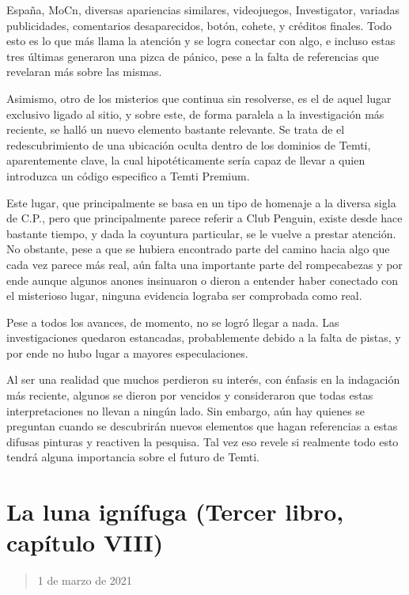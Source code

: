 \documentclass[
  spanish,
]{book}
\begin{document}
España, MoCn, diversas apariencias similares, videojuegos, Investigator, variadas publicidades, comentarios desaparecidos, botón, cohete, y créditos finales. Todo esto es lo que más llama la atención y se logra conectar con algo, e incluso estas tres últimas generaron una pizca de pánico, pese a la falta de referencias que revelaran más sobre las mismas.

Asimismo, otro de los misterios que continua sin resolverse, es el de aquel lugar exclusivo ligado al sitio, y sobre este, de forma paralela a la investigación más reciente, se halló un nuevo elemento bastante relevante. Se trata de el redescubrimiento de una ubicación oculta dentro de los dominios de Temti, aparentemente clave, la cual hipotéticamente sería capaz de llevar a quien introduzca un código especifico a Temti Premium.

Este lugar, que principalmente se basa en un tipo de homenaje a la diversa sigla de C.P., pero que principalmente parece referir a Club Penguin, existe desde hace bastante tiempo, y dada la coyuntura particular, se le vuelve a prestar atención. No obstante, pese a que se hubiera encontrado parte del camino hacia algo que cada vez parece más real, aún falta una importante parte del rompecabezas y por ende aunque algunos anones insinuaron o dieron a entender haber conectado con el misterioso lugar, ninguna evidencia lograba ser comprobada como real.

Pese a todos los avances, de momento, no se logró llegar a nada. Las investigaciones quedaron estancadas, probablemente debido a la falta de pistas, y por ende no hubo lugar a mayores especulaciones.

Al ser una realidad que muchos perdieron su interés, con énfasis en la indagación más reciente, algunos se dieron por vencidos y consideraron que todas estas interpretaciones no llevan a ningún lado. Sin embargo, aún hay quienes se preguntan cuando se descubrirán nuevos elementos que hagan referencias a estas difusas pinturas y reactiven la pesquisa. Tal vez eso revele si realmente todo esto tendrá alguna importancia sobre el futuro de Temti.

\hypertarget{la-luna-ignuxedfuga-tercer-libro-capuxedtulo-viii}{%
\section{La luna ignífuga (Tercer libro, capítulo VIII)}\label{la-luna-ignuxedfuga-tercer-libro-capuxedtulo-viii}}

\begin{quote}
1 de marzo de 2021
\end{quote}
\end{document}
